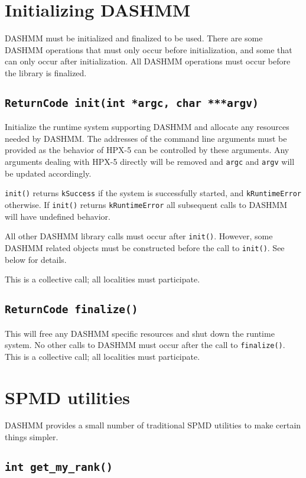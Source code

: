 \section{Initializing DASHMM}

DASHMM must be initialized and finalized to be used. There are some DASHMM
operations that must only occur before initialization, and some that can only
occur after initialization. All DASHMM operations must occur before the
library is finalized.

\subsection{{\tt ReturnCode init(int *argc, char ***argv)}}

Initialize the runtime system supporting DASHMM and allocate any resources
needed by DASHMM. The addresses of the command line arguments must be
provided as the behavior of HPX-5 can be controlled by these arguments. Any
arguments dealing with HPX-5 directly will be removed and {\tt argc} and
{\tt argv} will be updated accordingly.

{\tt init()} returns {\tt kSuccess} if the system is successfully started, and
{\tt kRuntimeError} otherwise. If {\tt init()} returns {\tt kRuntimeError} all
subsequent calls to DASHMM will have undefined behavior.

All other DASHMM library calls must occur after {\tt init()}. However, some
DASHMM related objects must be constructed before the call to {\tt init()}. See
below for details.

This is a collective call; all localities must participate.

\subsection{{\tt ReturnCode finalize()}}

This will free any DASHMM specific resources and shut down the runtime system.
No other calls to DASHMM must occur after the call to {\tt finalize()}. This is
a collective call; all localities must participate.


\section{SPMD utilities}

DASHMM provides a small number of traditional SPMD utilities to make certain
things simpler.

\subsection{{\tt int get\_my\_rank()}}

